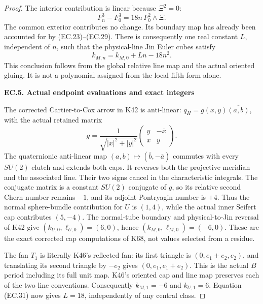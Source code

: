 \begin{proof}
The interior contribution is linear because \(\Xi^2=0\):
\[
 F_n^3-F_0^3=18n\,F_0^2\wedge\Xi .
                                                        \tag{EC.30}
\]
The common exterior contributes no change. Its boundary map
has already been accounted for by (EC.23)--(EC.29).
There is consequently one real constant \(L\), independent
of \(n\), such that the physical-line Jin Euler cubes satisfy
\[
                         k_{M,n}=k_{M,0}+Ln-18n^2 .
                                                        \tag{EC.31}
\]
This conclusion follows from the global relative line map
and the actual oriented gluing. It is not a polynomial assigned
from the local fifth form alone.

\par

\medskip\noindent\textbf{EC.5. Actual endpoint evaluations and exact integers}

\par\nobreak

The corrected Cartier-to-Cox arrow in K42 is anti-linear:
\(q_H=g(x,y)\overline{(a,b)}\), with the actual retained matrix
\[
 g=\frac1{\sqrt{|x|^2+|y|^2}}
       \begin{pmatrix}y&-\overline x\\x&\overline y\end{pmatrix}.
\]
The quaternionic anti-linear map
\((a,b)\mapsto(\overline b,-\overline a)\) commutes with every
\(SU(2)\) clutch and extends both caps. It reverses both the
projective meridian and the associated line. Their two signs cancel
in the characteristic integrals. The conjugate matrix is a constant
\(SU(2)\) conjugate of \(g\), so its relative second Chern number
remains \(-1\), and its adjoint Pontryagin number is \(+4\).
Thus the normal sphere-bundle contribution for \(U\) is \((1,4)\),
while the actual inner Seifert cap contributes \((5,-4)\).
The normal-tube boundary and physical-to-Jin reversal of K42 give
\((k_{U,0},\ell_{U,0})=(6,0)\), hence
\((k_{M,0},\ell_{M,0})=(-6,0)\). These are the exact corrected
cap computations of K68, not values selected from a residue.

The fan \(T_1\) is literally K46's reflected fan: its first
triangle is \((0,e_1+e_2,e_2)\), and translating its second
triangle by \(-e_2\) gives \((0,e_1,e_1+e_2)\). This is the
actual \(B\) period including its full unit map. K46's oriented
cap and line map preserves each of the two line conventions.
Consequently \(k_{M,1}=-6\) and \(k_{U,1}=6\). Equation
(EC.31) now gives \(L=18\), independently of any central class.


\end{proof}
